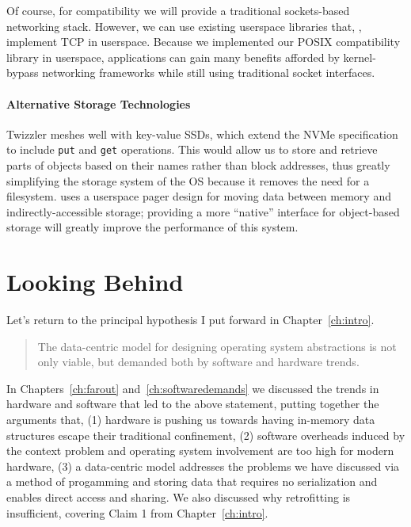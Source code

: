     Of course, for compatibility we will provide a traditional sockets-based networking stack. However,
    we can use existing userspace libraries that, \eg, implement TCP in userspace.
    Because we implemented our POSIX compatibility library in userspace, applications can gain many
    benefits afforded by kernel-bypass networking frameworks while still using traditional socket
    interfaces.

\fi

\paragraph{Alternative Storage Technologies}

Twizzler meshes well with key-value SSDs, which extend the NVMe
specification to include \texttt{put} and \texttt{get} operations. This would allow us to store and
retrieve parts of objects based on their names rather than block addresses, thus greatly
simplifying the storage system of the OS because it removes the need for a filesystem. \Twizzler
uses a userspace pager design for moving data between memory and indirectly-accessible storage;
providing a more ``native'' interface for object-based storage will greatly improve the performance
of this system.



\section{Looking Behind}


Let's return to the principal hypothesis I put forward in Chapter~\ref{ch:intro}.

\begin{quotation}
    \noindent The data-centric model
    for designing operating system abstractions is not only viable, but demanded both by software and hardware trends.
\end{quotation}

In Chapters~\ref{ch:farout} and~\ref{ch:softwaredemands} we discussed the trends in hardware and software that led to
the above statement, putting together the arguments that, (1) hardware is pushing us towards having in-memory
data structures escape their traditional confinement, (2) software overheads induced by the context problem and
operating system involvement are too high for modern hardware, (3) a data-centric model addresses the problems we have
discussed via a method of progamming and storing data that requires no serialization and enables direct access and
sharing. We also discussed why retrofitting is insufficient, covering Claim 1 from Chapter~\ref{ch:intro}.

